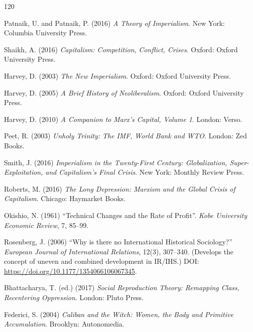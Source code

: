 \begin{singlespace}
\begin{thebibliography}{120}

Patnaik, U. and Patnaik, P. (2016) \emph{A Theory of Imperialism}.
New York: Columbia University Press.

Shaikh, A. (2016) \emph{Capitalism: Competition, Conflict, Crises}.
Oxford: Oxford University Press.

Harvey, D. (2003) \emph{The New Imperialism}.
Oxford: Oxford University Press.

Harvey, D. (2005) \emph{A Brief History of Neoliberalism}.
Oxford: Oxford University Press.

Harvey, D. (2010) \emph{A Companion to Marx's Capital, Volume 1}.
London: Verso.

Peet, R. (2003) \emph{Unholy Trinity: The IMF, World Bank and WTO}.
London: Zed Books.

Smith, J. (2016) \emph{Imperialism in the Twenty-First Century: Globalization, Super-Exploitation, and Capitalism's Final Crisis}.
New York: Monthly Review Press.

Roberts, M. (2016) \emph{The Long Depression: Marxism and the Global Crisis of Capitalism}.
Chicago: Haymarket Books.

Okishio, N. (1961) ``Technical Changes and the Rate of Profit''.
\emph{Kobe University Economic Review}, 7, 85--99.

Rosenberg, J. (2006) ``Why is there no International Historical Sociology?'' \emph{European Journal of International Relations}, 12(3), 307--340.
(Develops the concept of uneven and combined development in IR/IHS.)
DOI: \url{https://doi.org/10.1177/1354066106067345}.

Bhattacharya, T. (ed.) (2017) \emph{Social Reproduction Theory: Remapping Class, Recentering Oppression}.
London: Pluto Press.

Federici, S. (2004) \emph{Caliban and the Witch: Women, the Body and Primitive Accumulation}.
Brooklyn: Autonomedia.



\end{thebibliography}
\end{singlespace}
